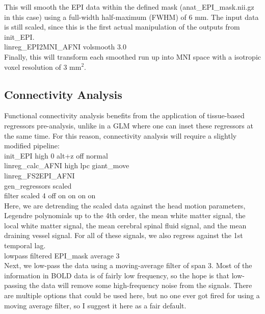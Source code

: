 \documentclass[final,titlepage,letterpaper,oneside,12pt]{article}
\renewcommand{\texttt}[2][BrickRed]{\textcolor{#1}{\ttfamily #2}}%
\begin{document}
This will smooth the EPI data within the defined mask (\texttt{anat\_EPI\_mask.nii.gz} in this case) using a full-width half-maximum (FWHM) of 6 mm. The input data is still scaled, since this is the first actual manipulation of the outputs from \texttt{init\_EPI}. \\

\noindent
\texttt{linreg\_EPI2MNI\_AFNI volsmooth 3.0} \\

Finally, this will transform each smoothed run up into MNI space with a isotropic voxel resolution of 3 mm$^2$. \\


\subsection{Connectivity Analysis}

Functional connectivity analysis benefits from the application of tissue-based regressors pre-analysis, unlike in a GLM where one can inset these regressors at the same time. For this reason, connectivity analysis will require a slightly modified pipeline: \\

\noindent
\texttt{init\_EPI high 0 alt+z off normal} \\
\texttt{linreg\_calc\_AFNI high lpc giant\_move} \\
\texttt{linreg\_FS2EPI\_AFNI} \\
\texttt{gen\_regressors scaled} \\

\noindent
\texttt{filter scaled 4 off on on on on} \\

Here, we are detrending the scaled data against the head motion parameters, Legendre polynomials up to the 4th order, the mean white matter signal, the local white matter signal, the mean cerebral spinal fluid signal, and the mean draining vessel signal. For all of these signals, we also regress against the 1st temporal lag. \\

\noindent
\texttt{lowpass filtered EPI\_mask average 3} \\

Next, we low-pass the data using a moving-average filter of span 3. Most of the information in BOLD data is of fairly low frequency, so the hope is that low-passing the data will remove some high-frequency noise from the signals. There are multiple options that could be used here, but no one ever got fired for using a moving average filter, so I suggest it here as a fair default.\\
\end{document}
